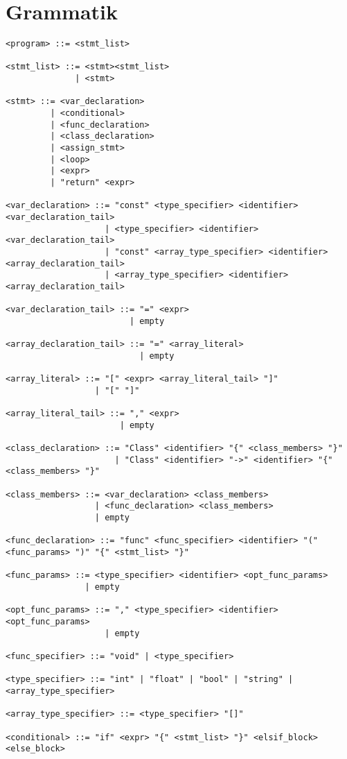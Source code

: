 \documentclass{TDP003mall}
\begin{document}
    \section{Grammatik}
\begin{verbatim}
<program> ::= <stmt_list>

<stmt_list> ::= <stmt><stmt_list>
              | <stmt>

<stmt> ::= <var_declaration> 
         | <conditional>
         | <func_declaration>
         | <class_declaration>
         | <assign_stmt>
         | <loop>
         | <expr>
         | "return" <expr>

<var_declaration> ::= "const" <type_specifier> <identifier> <var_declaration_tail>
                    | <type_specifier> <identifier> <var_declaration_tail>
                    | "const" <array_type_specifier> <identifier> <array_declaration_tail>
                    | <array_type_specifier> <identifier> <array_declaration_tail>

<var_declaration_tail> ::= "=" <expr>
                         | empty

<array_declaration_tail> ::= "=" <array_literal>
                           | empty

<array_literal> ::= "[" <expr> <array_literal_tail> "]"
                  | "[" "]"

<array_literal_tail> ::= "," <expr>
                       | empty

<class_declaration> ::= "Class" <identifier> "{" <class_members> "}"
                      | "Class" <identifier> "->" <identifier> "{" <class_members> "}"

<class_members> ::= <var_declaration> <class_members>
                  | <func_declaration> <class_members>
                  | empty

<func_declaration> ::= "func" <func_specifier> <identifier> "(" <func_params> ")" "{" <stmt_list> "}"

<func_params> ::= <type_specifier> <identifier> <opt_func_params>
                | empty

<opt_func_params> ::= "," <type_specifier> <identifier> <opt_func_params>
                    | empty

<func_specifier> ::= "void" | <type_specifier>

<type_specifier> ::= "int" | "float" | "bool" | "string" | <array_type_specifier>

<array_type_specifier> ::= <type_specifier> "[]"

<conditional> ::= "if" <expr> "{" <stmt_list> "}" <elsif_block> <else_block>


\end{verbatim}
\end{document}
